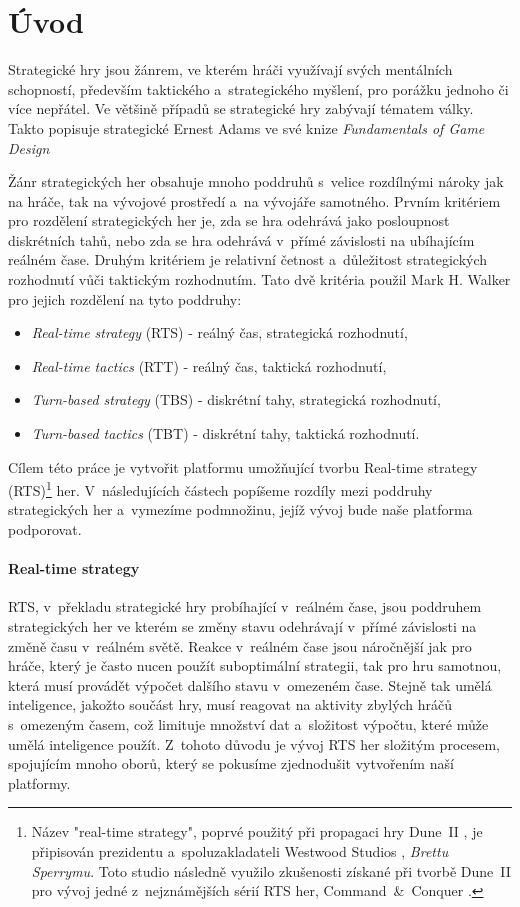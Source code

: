 \chapter{Úvod}
\label{sec:uvod}

Strategické hry jsou žánrem, ve kterém hráči využívají svých mentálních schopností, především taktického a~strategického myšlení, pro porážku jednoho či více nepřátel. Ve většině případů se strategické hry zabývají tématem války. Takto popisuje strategické Ernest Adams ve své knize \textit{Fundamentals of Game Design} \citep[str.~419]{book:gamefund}

Žánr strategických her obsahuje mnoho poddruhů s~velice rozdílnými nároky jak na hráče, tak na vývojové prostředí a~na vývojáře samotného. Prvním kritériem pro rozdělení strategických her je, zda se hra odehrává jako posloupnost diskrétních tahů, nebo zda se hra odehrává v~přímé závislosti na ubíhajícím reálném čase. Druhým kritériem je relativní četnost a~důležitost strategických rozhodnutí vůči taktickým rozhodnutím. Tato dvě kritéria použil Mark H. Walker \citep{site:stratg05} pro jejich rozdělení na tyto poddruhy:
\begin{itemize}
	\item \emph{Real-time strategy} (RTS) - reálný čas, strategická rozhodnutí,
	\item \emph{Real-time tactics} (RTT) - reálný čas, taktická rozhodnutí,
	\item \emph{Turn-based strategy} (TBS) - diskrétní tahy, strategická rozhodnutí,
	\item \emph{Turn-based tactics} (TBT) - diskrétní tahy, taktická rozhodnutí.
\end{itemize}

Cílem této práce je vytvořit platformu umožňující tvorbu Real-time strategy (RTS)\footnote{Název "real-time strategy", poprvé použitý při propagaci hry Dune~II \citep{site:dune2}, je připisován prezidentu a~spoluzakladateli Westwood Studios \citep{site:westwood}, \emph{Brettu Sperrymu}. Toto studio následně využilo zkušenosti získané při tvorbě Dune~II pro vývoj jedné z~nejznámějších sérií RTS her, Command~\&~Conquer \citep{site:cmdcnq}.} her. V~následujících částech popíšeme rozdíly mezi poddruhy strategických her a~vymezíme podmnožinu, jejíž vývoj bude naše platforma podporovat. 

\subsubsection{Real-time strategy}
 RTS, v~překladu strategické hry probíhající v~reálném čase, jsou poddruhem strategických her ve kterém se změny stavu odehrávají v~přímé závislosti na změně času v~reálném světě. Reakce v~reálném čase jsou náročnější jak pro hráče, který je často nucen použít suboptimální strategii, tak pro hru samotnou, která musí provádět výpočet dalšího stavu v~omezeném čase. Stejně tak umělá inteligence, jakožto součást hry, musí reagovat na aktivity zbylých hráčů s~omezeným časem, což limituje množství dat a~složitost výpočtu, které může umělá inteligence použít. Z~tohoto důvodu je vývoj RTS her složitým procesem, spojujícím mnoho oborů, který se pokusíme zjednodušit vytvořením naší platformy.

